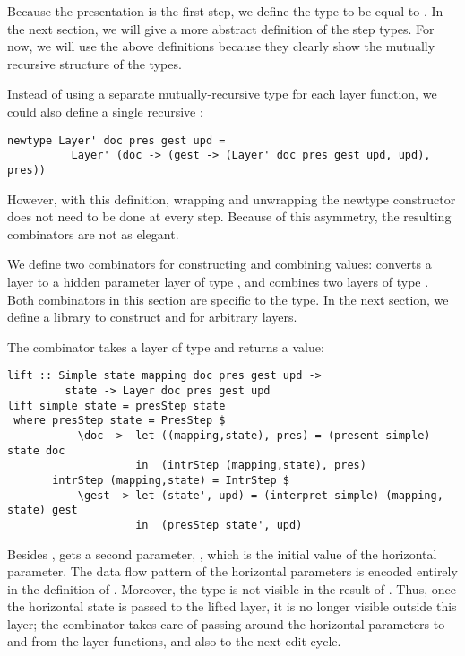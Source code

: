 \documentclass[preprint,natbib]{sigplanconf}
\begin{document}
Because the presentation is the first step, we define the  type to be equal to . In the next section, we will give a more abstract definition of the step types. For now, we will use the above definitions because they clearly show the mutually recursive structure of the types. %

Instead of using a separate mutually-recursive type for each layer function, we could also define a single recursive :

\begin{small}
\begin{verbatim}
newtype Layer' doc pres gest upd = 
          Layer' (doc -> (gest -> (Layer' doc pres gest upd, upd),  pres))
\end{verbatim}
\end{small}

However, with this definition, wrapping and unwrapping the newtype constructor does not need to be done at every step. Because of this asymmetry, the resulting combinators are not as elegant.

We define two combinators for constructing and combining  values:  converts  a  layer to a hidden parameter layer of type , and  combines two layers of type . Both combinators in this section are specific to the  type. In the next section, we define a library to construct  and  for arbitrary layers.



The combinator  takes a layer of type  and returns a  value:

\begin{small}
\begin{verbatim}
lift :: Simple state mapping doc pres gest upd ->
         state -> Layer doc pres gest upd
lift simple state = presStep state 
 where presStep state = PresStep $
           \doc ->  let ((mapping,state), pres) = (present simple) state doc                                         
                    in  (intrStep (mapping,state), pres)
       intrStep (mapping,state) = IntrStep $
           \gest -> let (state', upd) = (interpret simple) (mapping, state) gest                     
                    in  (presStep state', upd)
\end{verbatim}
\end{small}

Besides ,  gets a second parameter, , which is the initial value of the horizontal parameter. The data flow pattern of the horizontal parameters is encoded entirely in the definition of . Moreover, the  type is not visible in the result of . Thus, once the horizontal state is passed to the lifted layer, it is no longer visible outside this layer; the  combinator takes care of passing around the horizontal parameters to and from the layer functions, and also to the next edit cycle. 
\end{document}
